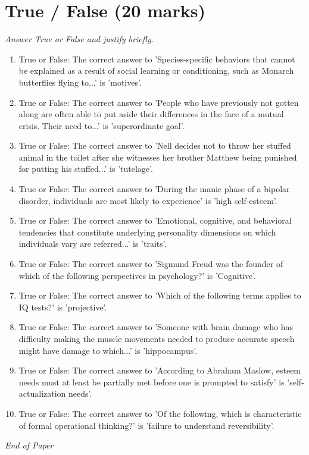 \documentclass[12pt]{article}
\begin{document}
\section*{True / False (20 marks)}
\textit{Answer True or False and justify briefly.}
\begin{enumerate}[label=\arabic*.]
\item True or False: The correct answer to 'Species-specific behaviors that cannot be explained as a result of social learning or conditioning, such as Monarch butterflies flying to...' is 'motives'.
\item True or False: The correct answer to 'People who have previously not gotten along are often able to put aside their differences in the face of a mutual crisis. Their need to...' is 'superordinate goal'.
\item True or False: The correct answer to 'Nell decides not to throw her stuffed animal in the toilet after she witnesses her brother Matthew being punished for putting his stuffed...' is 'tutelage'.
\item True or False: The correct answer to 'During the manic phase of a bipolar disorder, individuals are most likely to experience' is 'high self-esteem'.
\item True or False: The correct answer to 'Emotional, cognitive, and behavioral tendencies that constitute underlying personality dimensions on which individuals vary are referred...' is 'traits'.
\item True or False: The correct answer to 'Sigmund Freud was the founder of which of the following perspectives in psychology?' is 'Cognitive'.
\item True or False: The correct answer to 'Which of the following terms applies to IQ tests?' is 'projective'.
\item True or False: The correct answer to 'Someone with brain damage who has difficulty making the muscle movements needed to produce accurate speech might have damage to which...' is 'hippocampus'.
\item True or False: The correct answer to 'According to Abraham Maslow, esteem needs must at least be partially met before one is prompted to satisfy' is 'self-actualization needs'.
\item True or False: The correct answer to 'Of the following, which is characteristic of formal operational thinking?' is 'failure to understand reversibility'.
\end{enumerate}

\vfill
\noindent\textit{End of Paper}
\end{document}
